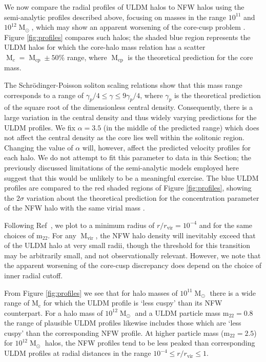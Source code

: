 \documentclass{pasa}%
\begin{document}
We now compare the radial profiles of ULDM halos to NFW halos using the semi-analytic profiles described above, focusing on masses in the range $10^{11}$ and $10^{12} \operatorname{M}_{\odot}$, which may show an apparent worsening of the core-cusp problem \cite{Robles:2018fur}. Figure \ref{fig:profiles} compares such halos; the shaded blue region represents the ULDM halos for which the core-halo mass relation has a scatter $\operatorname{M}_c = \operatorname{M}_{\mathrm{cp}} \pm 50 \% $ range, where $\operatorname{M}_{\mathrm{cp}}$ is the theoretical prediction for the core mass.

The  Schr{\"o}dinger-Poisson soliton scaling relations show that this mass range corresponds to a range of $ \gamma_p /4 \leq \gamma \leq 9\gamma_p/4$, where $\gamma_p$ is the theoretical prediction of the square root of the dimensionless central density. Consequently, there is a large variation in the central density and thus widely varying predictions for the ULDM profiles. We fix $\alpha = 3.5$ (in the middle of the predicted range) which does not affect the central density as the core lies well within the solitonic region. Changing the value of $\alpha$ will, however, affect the predicted velocity profiles for each halo. We do not attempt to fit this parameter to data in this Section; the previously discussed limitations of the semi-analytic models employed here suggest that this would be unlikely to be a meaningful exercise. The blue ULDM profiles are compared to the red shaded regions of Figure \ref{fig:profiles}, showing the $2\sigma$ variation about the theoretical prediction for the concentration parameter of the NFW halo with the same virial mass \cite{Maccio:2008pcd}. 


Following Ref~\cite{Robles:2018fur}, we plot to a minimum radius of $r/r_{\mathrm{vir}} = 10^{-4}$ and for the same choices of $\mathrm{m_{22}}$. For any $\operatorname{M}_{\mathrm{vir}}$, the NFW halo density  will inevitably exceed that of the ULDM halo at very small radii, though the threshold for this transition may be arbitrarily small, and not observationally relevant. However, we note that the apparent worsening of the core-cusp discrepancy does depend on the choice of inner radial cutoff.

From Figure \ref{fig:profiles} we see that for halo masses of $10^{11}\operatorname{M}_{\odot}$ there is a wide range of $\mathrm{M_c}$ for which the ULDM profile is `less cuspy' than its NFW counterpart. For a halo mass of $10^{12}\operatorname{M}_{\odot}$ and a ULDM particle mass $\mathrm{m_{22}}=0.8$ the range of plausible ULDM profiles likewise includes those which are `less cuspy' than the corresponding NFW profile. At higher particle mass ($\mathrm{m_{22}}=2.5$) for $10^{12}\operatorname{M}_{\odot}$ halos, the NFW profiles tend to be less peaked than corresponding ULDM profiles at radial distances in  the range $10^{-4}\leq r/r_{\mathrm{vir}} \leq 1$.  
\end{document}
